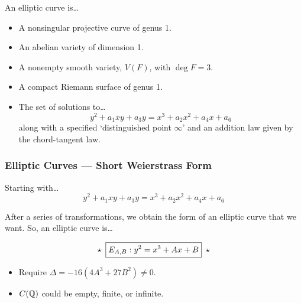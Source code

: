 



\begin{frame}[plain]
\begin{dfn}
An elliptic curve is\dots
\begin{itemize}
\item A nonsingular projective curve of genus 1.
\item An abelian variety of dimension 1.
\item A nonempty smooth variety, $V(F)$, with $\deg F=3$.
\item A compact Riemann surface of genus 1.
\item The set of solutions to\dots
	\[
	y^2 + a_1 xy + a_3y = x^3 + a_2 x^2 + a_4 x + a_6
	\]
along with a specified `distinguished point $\infty$' and an addition law given by the chord-tangent law.
\end{itemize}
\end{dfn}
\end{frame}



\begin{frame}[plain] \frametitle{Elliptic Curves --- Short Weierstrass Form}

Starting with\dots
	\[
	y^2 + a_1 xy + a_3y = x^3 + a_2 x^2 + a_4 x + a_6
	\] \pspace 

After a series of transformations, we obtain the form of an elliptic curve that we want. So, an elliptic curve is\dots

	\[
	\star \enskip \boxed{E_{A,B}: y^2 = x^3 + Ax + B} \enskip \star
	\] \pspace

\begin{itemize}
\item Require $\Delta= -16(4A^3+27B^2) \neq 0$.
\item $C(\mathbb{Q})$ could be empty, finite, or infinite. 
\end{itemize}
\end{frame}



